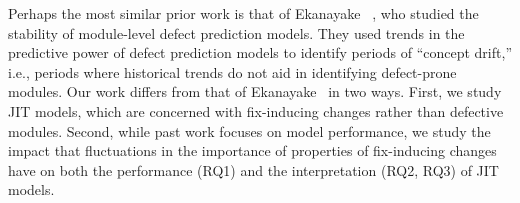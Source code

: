 Perhaps the most similar prior work is that of Ekanayake \ea~\cite{ekanayake2009msr}, who studied the stability of module-level defect prediction models.
They used trends in the predictive power of defect prediction models to identify periods of ``concept drift,'' i.e., periods where historical trends do not aid in identifying defect-prone modules. 
Our work differs from that of Ekanayake \ea~in two ways.
First, we study JIT models, which are concerned with fix-inducing changes rather than defective modules.
Second, while past work focuses on model performance, we study the impact that fluctuations in the importance of properties of fix-inducing changes have on both the performance (RQ1) and the interpretation (RQ2, RQ3) of JIT models.
